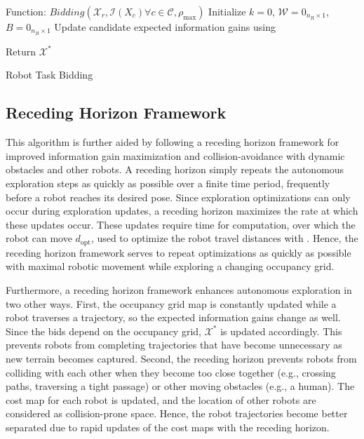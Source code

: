 \begin{algorithm}
	Function: $Bidding(\mathcal X_r,\mathcal I(X_c)\forall c\in\mathcal C,\rho_\text{max})$\;
	Initialize $k=0$, $\mathcal W=0_{n_R\times1}$, $B=0_{n_R\times1}$\;
	Update candidate expected information gains using \;

	Return $\mathcal X^*$\;
\caption{Robot Task Bidding}
\label{alg:bidding}
\end{algorithm}


\subsection{Receding Horizon Framework}
This algorithm is further aided by following a receding horizon framework for improved information gain maximization and collision-avoidance with dynamic obstacles and other robots. A receding horizon simply repeats the autonomous exploration steps as quickly as possible over a finite time period, frequently before a robot reaches its desired pose. Since exploration optimizations can only occur during exploration updates, a receding horizon maximizes the rate at which these updates occur. These updates require time for computation, over which the robot can move $d_\text{opt}$, used to optimize the robot travel distances with . Hence, the receding horizon framework serves to repeat optimizations as quickly as possible with maximal robotic movement while exploring a changing occupancy grid.

Furthermore, a receding horizon framework enhances autonomous exploration in two other ways. First, the occupancy grid map is constantly updated while a robot traverses a trajectory, so the expected information gains change as well. Since the bids depend on the occupancy grid, $\mathcal X^*$ is updated accordingly. This prevents robots from completing trajectories that have become unnecessary as new terrain becomes captured. Second, the receding horizon prevents robots from colliding with each other when they become too close together (e.g., crossing paths, traversing a tight passage) or other moving obstacles (e.g., a human). The cost map for each robot is updated, and the location of other robots are considered as collision-prone space. Hence, the robot trajectories become better separated due to rapid updates of the cost maps with the receding horizon. 

